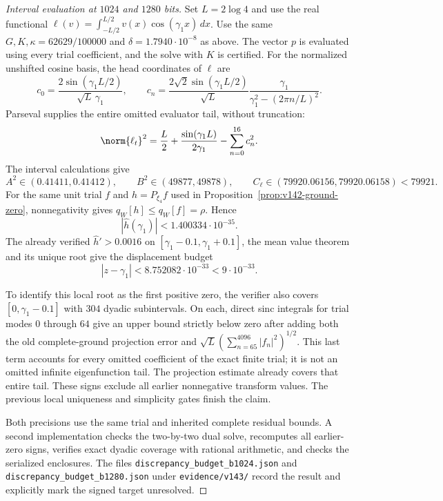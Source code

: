 \begin{proof}[Interval evaluation at $1024$ and $1280$ bits]
Set $L=2\log4$ and use the real functional
$\ell(v)=\int_{-L/2}^{L/2}v(x)\cos(\gamma_1x)\,dx$.
Use the same $G,K,\kappa=62629/100000$ and
$\delta=1.7940\cdot10^{-8}$ as above. The vector $p$ is evaluated
using every trial coefficient, and the solve with $K$ is certified.
For the normalized unshifted cosine basis, the head coordinates of
$\ell$ are
\[
 c_0=\frac{2\sin(\gamma_1L/2)}{\sqrt L\,\gamma_1},\qquad
 c_n=\frac{2\sqrt2\sin(\gamma_1L/2)}{\sqrt L}
       \frac{\gamma_1}{\gamma_1^2-(2\pi n/L)^2}.
\]
Parseval supplies the entire omitted evaluator tail, without truncation:
\[
 \norm{\ell_t}^2=\frac L2+\frac{\sin(\gamma_1L)}{2\gamma_1}
                    -\sum_{n=0}^{16}c_n^2.
\]
The interval calculations give
\[
 A^2\in(0.41411,0.41412),\qquad
 B^2\in(49877,49878),\qquad C_\ell\in(79920.06156,79920.06158)<79921.
\]
For the same unit trial $f$ and $h=P_{\xi_4}f$ used in
Proposition~\ref{prop:v142-ground-zero}, nonnegativity gives
$q_W[h]\le q_W[f]=\rho$. Hence
\[
 |\widehat h(\gamma_1)|<1.400334\cdot10^{-35}.
\]
The already verified $\widehat h'>0.0016$ on
$[\gamma_1-0.1,\gamma_1+0.1]$, the mean value theorem and its unique
root give the displacement budget
\[
 |z-\gamma_1|<8.752082\cdot10^{-33}<9\cdot10^{-33}.
\]

To identify this local root as the first positive zero, the verifier
also covers $[0,\gamma_1-0.1]$ with $304$ dyadic subintervals.
On each, direct sinc integrals for trial modes $0$ through $64$ give
an upper bound strictly below zero after adding both the old
complete-ground projection error and
$\sqrt L(\sum_{n=65}^{4096}|f_n|^2)^{1/2}$. This last term accounts
for every omitted coefficient of the exact finite trial; it is not
an omitted infinite eigenfunction tail. The projection estimate
already covers that entire tail. These signs exclude all earlier
nonnegative transform values. The previous local uniqueness and
simplicity gates finish the claim.

Both precisions use the same trial and inherited complete residual
bounds. A second implementation checks the two-by-two dual solve,
recomputes all earlier-zero signs, verifies exact dyadic coverage
with rational arithmetic, and checks the serialized enclosures.
The files \texttt{discrepancy\_budget\_b1024.json} and
\texttt{discrepancy\_budget\_b1280.json} under \texttt{evidence/v143/}
record the result and explicitly mark the signed target unresolved.
\end{proof}

